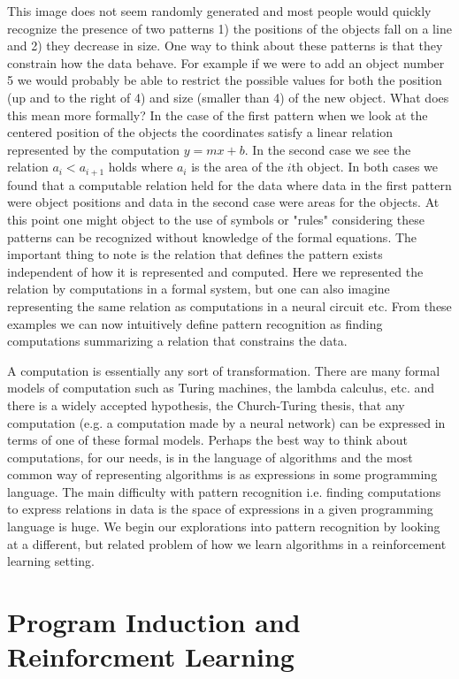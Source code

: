\documentclass[a4paper,12pt]{article}
\begin{document}
This image does not seem randomly generated and most people would
quickly recognize the presence of two patterns 1) the positions of the objects fall on a line and 2) they decrease in
size.  One way to think about these patterns is that they constrain how the data behave.  For example if we were to add an object number 5 we would probably be able to restrict the possible values for both the position (up and to the right of 4) and size (smaller than 4) of the new object.  What does this mean more formally?  In the case of the first
pattern when we look at the centered position of the objects the
coordinates satisfy a linear relation represented by the computation
$y=mx+b$.  In the second case we see the relation $a_i<a_{i+1}$ holds where $a_i$ is
the area of the $i$th object.  In both cases we found that a computable
relation held for the data where data in the first pattern were object
positions and data in the second case were areas for the objects.  At
this point one might object to the use of symbols or "rules"
considering these patterns can be recognized without knowledge of the
formal equations.  The important thing to note is the relation that
defines the pattern exists independent of how it is represented and
computed.  Here we represented the relation by computations in a
formal system, but one can also imagine representing the same relation
as computations in a neural circuit etc.  From these examples we can
now intuitively define pattern recognition as finding computations summarizing a relation that constrains the data. 

A computation is essentially any sort of transformation.  There are many formal models of computation such as Turing
machines, the lambda calculus, etc. and there is a widely accepted
hypothesis, the Church-Turing thesis, that any computation (e.g. a computation made by a neural
network) can be expressed in terms of one of these formal models.  Perhaps the best way to think
about computations, for our needs, is in the language of algorithms and the most common way of representing algorithms is as expressions in some programming
language.  The main difficulty with pattern recognition i.e. finding computations to express relations in data is the space of expressions in a given programming language is huge.  We begin our explorations into pattern recognition by looking at a different, but related problem of how we learn algorithms in a reinforcement learning setting.

\section{Program Induction and Reinforcment Learning}
\end{document}
